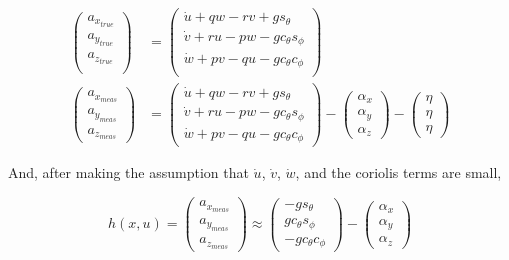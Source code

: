 \documentclass{article}
\newcommand{\cp}{c_{\phi}}
\newcommand{\ct}{c_{\theta}}
\newcommand{\sip}{s_{\phi}}
\newcommand{\sit}{s_{\theta}}
\begin{document}
\begin{equation}
\begin{aligned}
	\begin{pmatrix}
	a_{x_{true}} \\
	a_{y_{true}} \\
	a_{z_{true}} \\
	\end{pmatrix}
	&=
	\begin{pmatrix}
	\dot{u} + qw - rv + g\sit \\
	\dot{v} + ru - pw - g\ct\sip \\
	\dot{w} + pv - qu - g\ct\cp \\
	\end{pmatrix} \\
	\begin{pmatrix}
	a_{x_{meas}} \\
	a_{y_{meas}} \\
	a_{z_{meas}} \end{pmatrix}
	&= \begin{pmatrix}
	\dot{u} + qw - rv + g\sit \\
	\dot{v} + ru - pw - g\ct\sip \\
	\dot{w} + pv - qu - g\ct\cp \end{pmatrix}
		- \begin{pmatrix}
	\alpha_x \\
	\alpha_y \\
	\alpha_z \end{pmatrix}
	- \begin{pmatrix}
	\eta \\
	\eta \\
	\eta \end{pmatrix}
\end{aligned}
\end{equation}

And, after making the assumption that $\dot{u}$, $\dot{v}$, $\dot{w}$, and the coriolis terms are small,

\begin{equation}
	h(x,u) = 	\begin{pmatrix}
	a_{x_{meas}} \\
	a_{y_{meas}} \\
	a_{z_{meas}} \end{pmatrix}
	\approx \begin{pmatrix}
	-g\sit \\
	g\ct\sip \\
	-g\ct\cp \end{pmatrix}
	- \begin{pmatrix}
	\alpha_x \\
	\alpha_y \\
	\alpha_z \end{pmatrix}
\end{equation}
\end{document}
